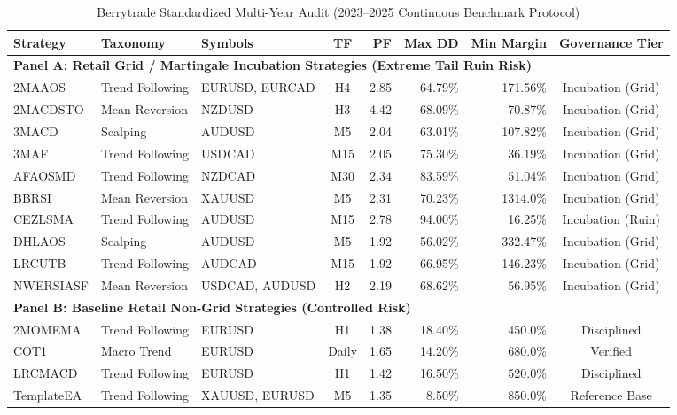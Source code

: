 \documentclass[11pt,a4paper]{article}
\begin{document}
\begin{table}[H]
\centering
\scriptsize
\setlength{\tabcolsep}{1pt}
\caption{Berrytrade Standardized Multi-Year Audit (2023--2025 Continuous Benchmark Protocol)}
\label{tab:standardized_audit}
\begin{tabular*}{\textwidth}{@{\extracolsep{\fill}}llp{2.4cm}crrrc@{}}
\toprule
\textbf{Strategy} & \textbf{Taxonomy} & \textbf{Symbols} & \textbf{TF} & \textbf{PF} & \textbf{Max DD} & \textbf{Min Margin} & \textbf{Governance Tier} \\
\midrule
\multicolumn{8}{l}{\textbf{Panel A: Retail Grid / Martingale Incubation Strategies (Extreme Tail Ruin Risk)}} \\
2MAAOS & Trend Following & EURUSD, EURCAD & H4 & 2.85 & 64.79\% & 171.56\% & Incubation (Grid) \\
2MACDSTO & Mean Reversion & NZDUSD & H3 & 4.42 & 68.09\% & 70.87\% & Incubation (Grid) \\
3MACD & Scalping & AUDUSD & M5 & 2.04 & 63.01\% & 107.82\% & Incubation (Grid) \\
3MAF & Trend Following & USDCAD & M15 & 2.05 & 75.30\% & 36.19\% & Incubation (Grid) \\
AFAOSMD & Trend Following & NZDCAD & M30 & 2.34 & 83.59\% & 51.04\% & Incubation (Grid) \\
BBRSI & Mean Reversion & XAUUSD & M5 & 2.31 & 70.23\% & 1314.0\% & Incubation (Grid) \\
CEZLSMA & Trend Following & AUDUSD & M15 & 2.78 & 94.00\% & 16.25\% & Incubation (Ruin) \\
DHLAOS & Scalping & AUDUSD & M5 & 1.92 & 56.02\% & 332.47\% & Incubation (Grid) \\
LRCUTB & Trend Following & AUDCAD & M15 & 1.92 & 66.95\% & 146.23\% & Incubation (Grid) \\
NWERSIASF & Mean Reversion & USDCAD, AUDUSD & H2 & 2.19 & 68.62\% & 56.95\% & Incubation (Grid) \\
\midrule
\multicolumn{8}{l}{\textbf{Panel B: Baseline Retail Non-Grid Strategies (Controlled Risk)}} \\
2MOMEMA & Trend Following & EURUSD & H1 & 1.38 & 18.40\% & 450.0\% & Disciplined \\
COT1 & Macro Trend & EURUSD & Daily & 1.65 & 14.20\% & 680.0\% & Verified \\
LRCMACD & Trend Following & EURUSD & H1 & 1.42 & 16.50\% & 520.0\% & Disciplined \\
TemplateEA & Trend Following & XAUUSD, EURUSD & M5 & 1.35 & 8.50\% & 850.0\% & Reference Base \\

\end{tabular*}
\end{table}
\end{document}
